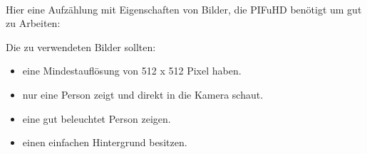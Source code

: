 \\
Hier eine Aufzählung mit Eigenschaften von Bilder, die PIFuHD benötigt um gut zu Arbeiten:
\\

Die zu verwendeten Bilder sollten:
\begin{itemize}
	\item eine Mindestauflösung von 512 x 512 Pixel haben.
	\item nur eine Person zeigt und direkt in die Kamera schaut.
	\item eine gut beleuchtet Person zeigen.
	\item einen einfachen Hintergrund besitzen.
\end{itemize}

